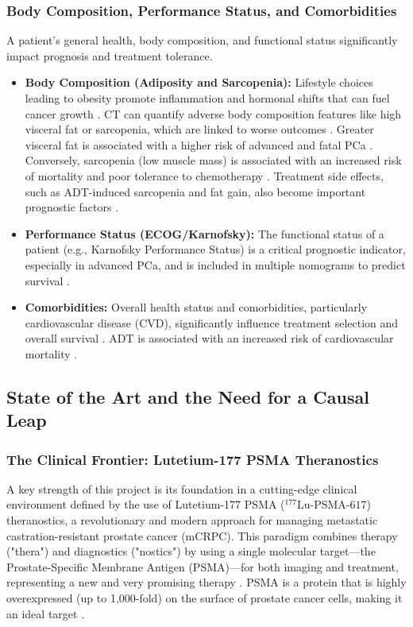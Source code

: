 \documentclass[11pt, a4paper]{article}
\begin{document}
\subsubsection{Body Composition, Performance Status, and Comorbidities}
A patient's general health, body composition, and functional status significantly impact prognosis and treatment tolerance.
\begin{itemize}
    \item \textbf{Body Composition (Adiposity and Sarcopenia):} Lifestyle choices leading to obesity promote inflammation and hormonal shifts that can fuel cancer growth \cite{UnknownAuthor2017, DickermanTorfadottir2019}. CT can quantify adverse body composition features like high visceral fat or sarcopenia, which are linked to worse outcomes \cite{LeePark2020, GrecoPiccolo2024}. Greater visceral fat is associated with a higher risk of advanced and fatal PCa \cite{WilsonTaaffe2022, DickermanTorfadottir2019}. Conversely, sarcopenia (low muscle mass) is associated with an increased risk of mortality and poor tolerance to chemotherapy \cite{LopezNewton2021, PablosRodrguezPinoSedeo2022}. Treatment side effects, such as ADT-induced sarcopenia and fat gain, also become important prognostic factors \cite{PablosRodrguezPinoSedeo2022, CariolouChristakoudi2024}.
    \item \textbf{Performance Status (ECOG/Karnofsky):} The functional status of a patient (e.g., Karnofsky Performance Status) is a critical prognostic indicator, especially in advanced PCa, and is included in multiple nomograms to predict survival \cite{UnknownAuthor2014}.
    \item \textbf{Comorbidities:} Overall health status and comorbidities, particularly cardiovascular disease (CVD), significantly influence treatment selection and overall survival \cite{HerlemannCowan2024, CooperbergBroering2009}. ADT is associated with an increased risk of cardiovascular mortality \cite{HubanksBoorjian2014, UnknownAuthor2017}.
\end{itemize}

\subsection{State of the Art and the Need for a Causal Leap}
\subsubsection{The Clinical Frontier: Lutetium-177 PSMA Theranostics}
A key strength of this project is its foundation in a cutting-edge clinical environment defined by the use of Lutetium-177 PSMA (${}^{177}\text{Lu-PSMA-617}$) theranostics, a revolutionary and modern approach for managing metastatic castration-resistant prostate cancer (mCRPC). This paradigm combines therapy ("thera") and diagnostics ("nostics") by using a single molecular target—the Prostate-Specific Membrane Antigen (PSMA)—for both imaging and treatment, representing a new and very promising therapy \cite{HennrichEder2022}. PSMA is a protein that is highly overexpressed (up to 1,000-fold) on the surface of prostate cancer cells, making it an ideal target \cite{HennrichEder2022, LingBlois2022}.
\end{document}
